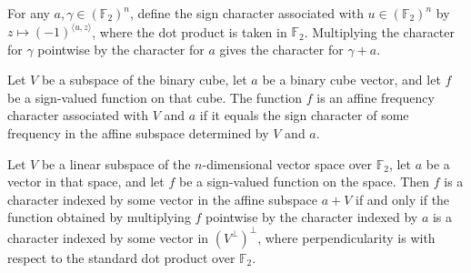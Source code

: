 \begin{theorem}
\leanok
{}
For any $a,\gamma\in(\mathbb F_2)^n$, define the sign character associated with
$u\in(\mathbb F_2)^n$ by $z\mapsto(-1)^{\langle u,z\rangle}$, where the dot product is
taken in $\mathbb F_2$. Multiplying the character for $\gamma$ pointwise by the
character for $a$ gives the character for $\gamma+a$.
\end{theorem}

\begin{definition}
\label{FABL.IsAffineFrequencyCharacter}
\leanok
{}
Let $V$ be a subspace of the binary cube, let $a$ be a binary cube vector, and let $f$
be a sign-valued function on that cube. The function $f$ is an affine frequency
character associated with $V$ and $a$ if it equals the sign character of some frequency
in the affine subspace determined by $V$ and $a$.
\end{definition}

\begin{theorem}
\label{FABL.isAffineFrequencyCharacter_iff_twist_isPerpendicularCharacter}
\leanok
{}
Let $V$ be a linear subspace of the $n$-dimensional vector space over $\mathbb F_2$, let
$a$ be a vector in that space, and let $f$ be a sign-valued function on the space. Then
$f$ is a character indexed by some vector in the affine subspace $a+V$ if and only if
the function obtained by multiplying $f$ pointwise by the character indexed by $a$ is a
character indexed by some vector in $(V^\perp)^\perp$, where perpendicularity is with
respect to the standard dot product over $\mathbb F_2$.
\end{theorem}

